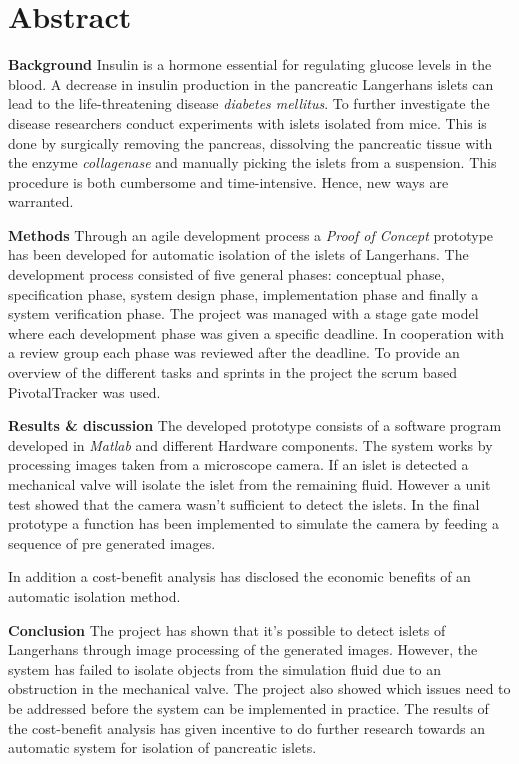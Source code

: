 \section*{Abstract}
\textbf{Background}
Insulin is a hormone essential for regulating glucose levels in the blood. A decrease in insulin production in the pancreatic Langerhans islets can lead to the life-threatening disease \textit{diabetes mellitus}. To further investigate the disease researchers conduct experiments with islets isolated from mice. This is done by surgically removing the pancreas, dissolving the pancreatic tissue with the enzyme \textit{collagenase} and manually picking the islets from a suspension. This procedure is both cumbersome and time-intensive. Hence, new ways are warranted.   

\textbf{Methods}
Through an agile development process a \textit{Proof of Concept} prototype has been developed for automatic isolation of the islets of Langerhans. The development process consisted of five general phases: conceptual phase,  specification phase, system design phase, implementation phase and finally a system verification phase. The project was managed with a stage gate model where each development phase was given a specific deadline. In cooperation with a review group each phase was reviewed after the deadline. To provide an overview of the different tasks and sprints in the project the scrum based PivotalTracker was used.   


\textbf{Results \& discussion} The developed prototype consists of a software program developed in \textit{Matlab} and different Hardware components.  The system works by processing images taken from a microscope camera. If an islet is detected a mechanical valve will isolate the islet from the remaining fluid. However a unit test showed that the camera wasn't sufficient to detect the islets. In the final prototype a function has been implemented to simulate the camera by feeding a sequence of pre generated images.

In addition a cost-benefit analysis has disclosed the economic benefits of an automatic isolation method.

\textbf{Conclusion}
The project has shown that it's possible to detect islets of Langerhans through image processing of the generated images. However, the system has failed to isolate objects from the simulation fluid due to an obstruction in the mechanical valve. The project also showed which issues need to be addressed before the system can be implemented in practice. The results of the cost-benefit analysis has given incentive to do further research towards an automatic system for isolation of pancreatic islets. 